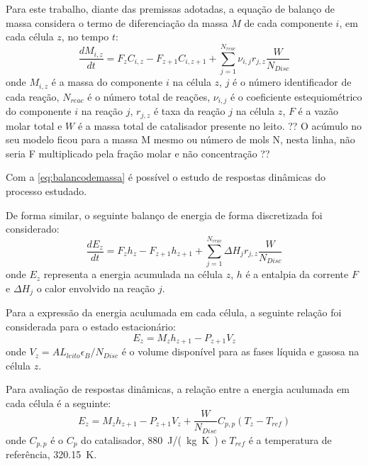 Para este trabalho, diante das premissas adotadas, a equação de balanço de massa
considera o termo de diferenciação da massa $M$ de cada componente $i$, em cada
célula $z$, no tempo $t$: 
\begin{equation}
\dfrac{dM_{i,z}}{dt} = F_z C_{i,z} - F_{z+1} C_{i,z+1} +
\displaystyle\sum_{j=1}^{N_{reac}} \nu_{i,j}r_{j,z} \dfrac{W}{N_{Disc}}
\label{eq:balancodemassa}
\end{equation}
onde $M_{i,z}$ é a massa do componente $i$ na célula $z$, $j$ é o número
identificador de cada reação, $N_{reac}$ é o número total de reações,
$\nu_{i,j}$ é o coeficiente estequiométrico do componente $i$ na reação $j$,
$r_{j,z}$ é taxa da reação $j$ na célula $z$, $F$ é a vazão molar total e $W$ é
a massa total de catalisador presente no leito.
?? O acúmulo no seu modelo ficou para a massa M mesmo ou número de mols N,
nesta linha, não seria F multiplicado pela fração molar e não concentração ??

Com a \autoref{eq:balancodemassa} é possível o estudo de respostas dinâmicas do
processo estudado.


De forma similar, o seguinte balanço de energia de forma
discretizada foi considerado:
\begin{equation}
\dfrac{dE_{z}}{dt} = F_zh_{z} - F_{z+1}h_{z+1} +
\displaystyle\sum_{j=1}^{N_{reac}} \Delta H_{j}r_{j,z} \dfrac{W}{N_{Disc}}
\label{eq:balancodeenergia}
\end{equation}
onde $E_{z}$ representa a energia acumulada na célula $z$, $h$ é a entalpia da
corrente $F$ e $\Delta H_{j}$ o calor envolvido na reação $j$.

Para a expressão da energia aculumada em cada célula, a seguinte relação
foi considerada para o estado estacionário:
\begin{equation}
E_{z} = M_{z}h_{z+1} - P_{z+1}V_{z}
\label{eq:holdupenergia}
\end{equation}
onde $V_{z} = AL_{leito}\epsilon_{B}/N_{Disc}$ é o volume disponível para as
fases líquida e gasosa na célula $z$.

Para avaliação de respostas dinâmicas, a relação entre a energia aculumada em
cada célula é a seguinte:
\begin{equation}
E_{z} = M_{z}h_{z+1} - P_{z+1}V_{z} +  \dfrac{W}{N_{Disc}}C_{p,p}(T_{z}-T_{ref})
\label{eq:holdupenergiadinamica}
\end{equation}
onde $C_{p,p}$ é o $C_p$ do catalisador, \SI{880}{J/(kg K)} e $T_{ref}$ é a
temperatura de referência, \SI{320,15}{K}.

